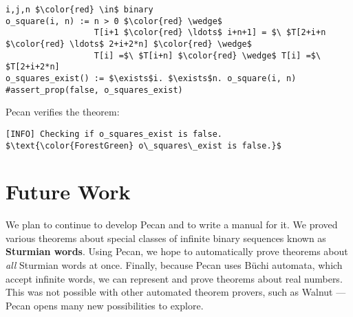 \documentclass[10pt,usenames,dvipsnames]{article}
\begin{document}
\begin{lstlisting}[language=pecan, basicstyle=\normalsize\ttfamily, mathescape=true, frame=single]
i,j,n $\color{red} \in$ binary
o_square(i, n) := n > 0 $\color{red} \wedge$ 
                  T[i+1 $\color{red} \ldots$ i+n+1] = $\ $T[2+i+n $\color{red} \ldots$ 2+i+2*n] $\color{red} \wedge$  
                  T[i] =$\ $T[i+n] $\color{red} \wedge$ T[i] =$\ $T[2+i+2*n]
o_squares_exist() := $\exists$i. $\exists$n. o_square(i, n)
#assert_prop(false, o_squares_exist)
\end{lstlisting}

Pecan verifies the theorem: 

\begin{lstlisting}[basicstyle=\normalsize\ttfamily, mathescape=true, frame=single]
[INFO] Checking if o_squares_exist is false.
$\text{\color{ForestGreen} o\_squares\_exist is false.}$
\end{lstlisting}

\section{Future Work}

We plan to continue to develop Pecan and to write a manual for it. 
We proved various theorems about special classes of infinite binary sequences known as \textbf{Sturmian words}.
Using Pecan, we hope to automatically prove theorems about \emph{all} Sturmian words at once.
Finally, because Pecan uses B\"uchi automata, which accept infinite words, we can represent and prove theorems about real numbers.
This was not possible with other automated theorem provers, such as Walnut \cite{walnut}---Pecan opens many new possibilities to explore.

\printbibliography
\end{document}
